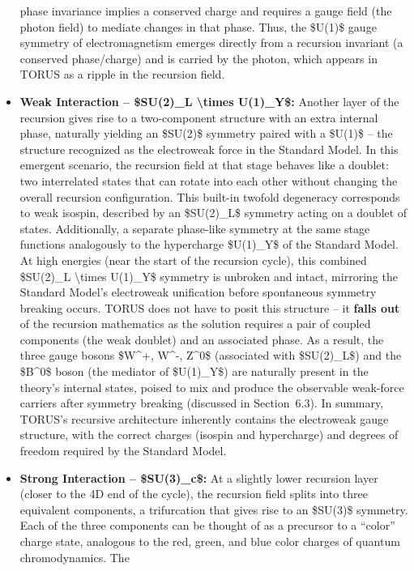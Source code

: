 \documentclass[]{article}
\begin{document}
\begin{itemize}
  phase invariance implies a conserved charge and requires a gauge field
  (the photon field) to mediate changes in that phase​. Thus, the
  \$U(1)\$ gauge symmetry of electromagnetism emerges directly from a
  recursion invariant (a conserved phase/charge) and is carried by the
  photon, which appears in TORUS as a ripple in the recursion field.
\item
  \textbf{Weak Interaction -- \$SU(2)\_L \textbackslash{}times
  U(1)\_Y\$:} Another layer of the recursion gives rise to a
  two-component structure with an extra internal phase, naturally
  yielding an \$SU(2)\$ symmetry paired with a \$U(1)\$ -- the structure
  recognized as the electroweak force in the Standard Model. In this
  emergent scenario, the recursion field at that stage behaves like a
  doublet: two interrelated states that can rotate into each other
  without changing the overall recursion configuration. This built-in
  twofold degeneracy corresponds to weak isospin, described by an
  \$SU(2)\_L\$ symmetry acting on a doublet of states​. Additionally, a
  separate phase-like symmetry at the same stage functions analogously
  to the hypercharge \$U(1)\_Y\$ of the Standard Model. At high energies
  (near the start of the recursion cycle), this combined \$SU(2)\_L
  \textbackslash{}times U(1)\_Y\$ symmetry is unbroken and intact,
  mirroring the Standard Model's electroweak unification before
  spontaneous symmetry breaking occurs. TORUS does not have to posit
  this structure -- it \textbf{falls out} of the recursion mathematics
  as the solution requires a pair of coupled components (the weak
  doublet) and an associated phase. As a result, the three gauge bosons
  \$W\^{}+, W\^{}-, Z\^{}0\$ (associated with \$SU(2)\_L\$) and the
  \$B\^{}0\$ boson (the mediator of \$U(1)\_Y\$) are naturally present
  in the theory's internal states, poised to mix and produce the
  observable weak-force carriers after symmetry breaking (discussed in
  Section~6.3). In summary, TORUS's recursive architecture inherently
  contains the electroweak gauge structure, with the correct charges
  (isospin and hypercharge) and degrees of freedom required by the
  Standard Model.
\item
  \textbf{Strong Interaction -- \$SU(3)\_c\$:} At a slightly lower
  recursion layer (closer to the 4D end of the cycle), the recursion
  field splits into three equivalent components, a trifurcation that
  gives rise to an \$SU(3)\$ symmetry​. Each of the three components can
  be thought of as a precursor to a ``color'' charge state, analogous to
  the red, green, and blue color charges of quantum chromodynamics. The

\end{itemize}
\end{document}
